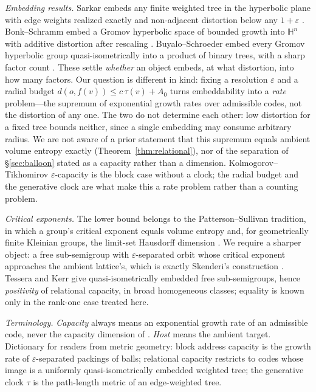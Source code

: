 \documentclass[11pt,reqno]{amsart}
\theoremstyle{plain}
\theoremstyle{definition}
\newcommand{\eps}{\varepsilon}
\begin{document}
\emph{Embedding results.} Sarkar embeds any finite weighted tree in the hyperbolic plane with edge weights realized exactly and non-adjacent distortion below any $1+\eps$ \cite{sarkar2011}. Bonk--Schramm embed a Gromov hyperbolic space of bounded growth into $\mathbb H^n$ with additive distortion after rescaling \cite{bonkschramm2000}. Buyalo--Schroeder embed every Gromov hyperbolic group quasi-isometrically into a product of binary trees, with a sharp factor count \cite{buyaloschroeder2005,buyaloschroeder2007}. These settle \emph{whether} an object embeds, at what distortion, into how many factors. Our question is different in kind: fixing a resolution $\eps$ and a radial budget $d(o,f(v))\le c\,\tau(v)+A_0$ turns embeddability into a \emph{rate} problem---the supremum of exponential growth rates over admissible codes, not the distortion of any one. The two do not determine each other: low distortion for a fixed tree bounds neither, since a single embedding may consume arbitrary radius. We are not aware of a prior statement that this supremum equals ambient volume entropy exactly (Theorem~\ref{thm:relational}), nor of the separation of \S\ref{sec:balloon} stated as a capacity rather than a dimension. Kolmogorov--Tikhomirov $\eps$-capacity is the block case without a clock; the radial budget and the generative clock are what make this a rate problem rather than a counting problem.

\emph{Critical exponents.} The lower bound belongs to the Patterson--Sullivan tradition, in which a group's critical exponent equals volume entropy and, for geometrically finite Kleinian groups, the limit-set Hausdorff dimension \cite{patterson1976,sullivan1979,bishopjones1997}. We require a sharper object: a free sub-semigroup with $\eps$-separated orbit whose critical exponent approaches the ambient lattice's, which is exactly Skenderi's construction \cite{skenderi2026}. Tessera \cite{tessera2008} and Kerr \cite{kerr2022} give quasi-isometrically embedded free sub-semigroups, hence \emph{positivity} of relational capacity, in broad homogeneous classes; equality is known only in the rank-one case treated here.

\emph{Terminology.} \emph{Capacity} always means an exponential growth rate of an admissible code, never the capacity dimension of \cite{buyaloschroeder2005}. \emph{Host} means the ambient target. Dictionary for readers from metric geometry: block address capacity is the growth rate of $\eps$-separated packings of balls; relational capacity restricts to codes whose image is a uniformly quasi-isometrically embedded weighted tree; the generative clock $\tau$ is the path-length metric of an edge-weighted tree.
\end{document}

